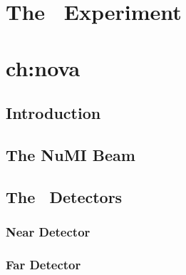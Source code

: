\chapter{The \nova~Experiment}
\chapter{ch:nova}

\section{Introduction}

\section{The NuMI Beam}

\section{The \nova~Detectors}

\subsection{Near Detector}

\subsection{Far Detector}